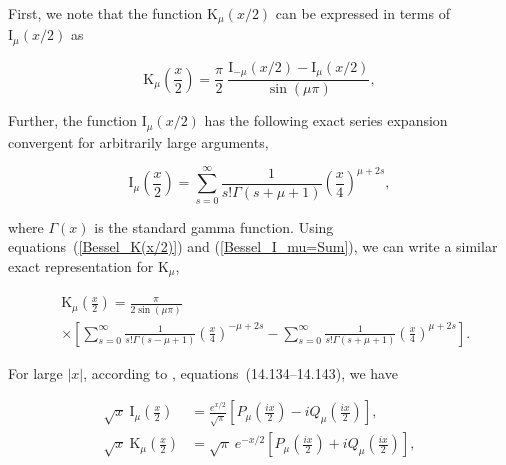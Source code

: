 \documentclass[draft]{agujournal2019}
\begin{document}
First, we note that the function $\mathrm{K}_{\mu}(x/2)$ can be expressed in
terms of $\mathrm{I}_{\mu}(x/2)$ as
\begin{linenomath*}
\begin{equation}
\mathrm{K}_{\mu}\left(  \frac{x}{2}\right)  =\frac{\pi}{2}\ \frac
{\mathrm{I}_{-\mu}\left(  x/2\right)  -\mathrm{I}_{\mu}\left(  x/2\right)
}{\sin\left(  \mu\pi\right)  }, 
\label{Bessel_K(x/2)}
\end{equation}
\end{linenomath*}
Further, the function $\mathrm{I}_{\mu}(x/2)$ has the following exact series
expansion convergent for arbitrarily large arguments,
\begin{linenomath*}
\begin{equation}
\mathrm{I}_{\mu}\left(  \frac{x}{2}\right)  =\sum_{s=0}^{\infty}\frac
{1}{s!\Gamma(s+\mu+1)}\left(  \frac{x}{4}\right)  ^{\mu+2s},
\label{Bessel_I_mu=Sum}
\end{equation}
\end{linenomath*}
where $\Gamma(x)$ is the standard gamma function. Using
equations~(\ref{Bessel_K(x/2)}) and (\ref{Bessel_I_mu=Sum}), we can write a
similar exact representation for $\mathrm{K}_{\mu}$,
\begin{linenomath*}
\begin{align}
&  \mathrm{K}_{\mu}\left(  \frac{x}{2}\right)  =\frac{\pi}{2\sin\left(  \mu
\pi\right)  }\nonumber\\
&  \times\left[  \sum_{s=0}^{\infty}\frac{1}{s!\Gamma(s-\mu+1)}\left(
\frac{x}{4}\right)  ^{-\mu+2s}-\sum_{s=0}^{\infty}\frac{1}{s!\Gamma(s+\mu
+1)}\left(  \frac{x}{4}\right)  ^{\mu+2s}\right]  . 
\label{Bessel_K_mu=Sum}
\end{align}
\end{linenomath*}
For large $|x|$, according to , equations~(14.134--14.143), we have
\begin{linenomath*}
\begin{subequations}
\label{IK_asymptotics}
\begin{align}
\sqrt{x}\ \mathrm{I}_{\mu}\left(  \frac{x}{2}\right)   &  =\frac{e^{x/2}%
}{\sqrt{\pi}}\left[  P_{\mu}\left(  \frac{ix}{2}\right)  -iQ_{\mu}\left(
\frac{ix}{2}\right)  \right]  ,\label{I_asymptotics}\\
\sqrt{x}\ \mathrm{K}_{\mu}(\frac{x}{2})  &  =\sqrt{\pi}%
\ e^{-x/2}\left[  P_{\mu}\left(  \frac{ix}{2}\right)  +iQ_{\mu}\left(
\frac{ix}{2}\right)  \right]  , 
\label{K_asymptotics}
\end{align}
\end{subequations}
\end{linenomath*}
\end{document}
